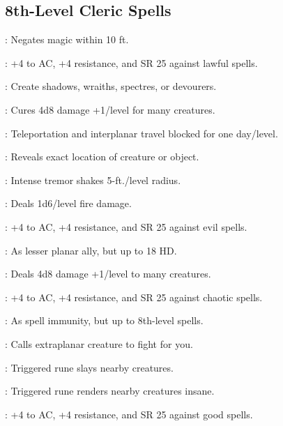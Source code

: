 \begin{multicols}{2}
\subsection{8th-Level Cleric Spells}
\begin{description*}
\item[\linkspell{Antimagic Field}:] Negates magic within 10 ft.
\item[\linkspell{Cloak of Chaos}:] +4 to AC, +4 resistance, and SR 25 against lawful spells.
\item[\linkspell{Create Greater Undead}:] Create shadows, wraiths, spectres, or devourers.
\item[\linkspell{Cure Critical Wounds, Mass}:] Cures 4d8 damage +1/level for many creatures.
\item[\linkspell{Dimensional Lock}:] Teleportation and interplanar travel blocked for one day/level.
\item[\linkspell{Discern Location}:] Reveals exact location of creature or object.
\item[\linkspell{Earthquake}:] Intense tremor shakes 5-ft./level radius.
\item[\linkspell{Fire Storm}:] Deals 1d6/level fire damage.
\item[\linkspell{Holy Aura}:] +4 to AC, +4 resistance, and SR 25 against evil spells.
\item[\linkspell{Planar Ally, Greater}:] As lesser planar ally, but up to 18 HD.
\item[\linkspell{Inflict Critical Wounds, Mass}:] Deals 4d8 damage +1/level to many creatures.
\item[\linkspell{Shield of Law}:] +4 to AC, +4 resistance, and SR 25 against chaotic spells.
\item[\linkspell{Spell Immunity, Greater}:] As spell immunity, but up to 8th-level spells.
\item[\linkspell{Summon Monster VIII}:] Calls extraplanar creature to fight for you.
\item[\linkspell{Symbol of Death}:] Triggered rune slays nearby creatures.
\item[\linkspell{Symbol of Insanity}:] Triggered rune renders nearby creatures insane.
\item[\linkspell{Unholy Aura}:] +4 to AC, +4 resistance, and SR 25 against good spells.
\end{description*}


\end{multicols}
